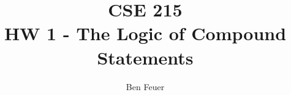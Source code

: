 \documentclass{report}
\title{\Huge{CSE 215}\\HW 1 - The Logic of Compound Statements}
\author{\huge{Ben Feuer}}
\date{}
\begin{document}
\maketitle

\qs{}{
}

\qs{}{
}
\end{document}
